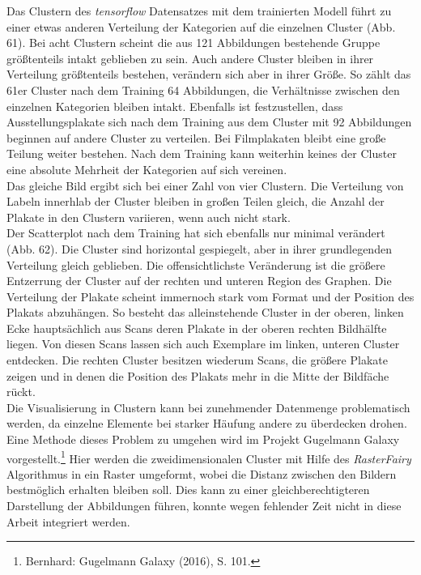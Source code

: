 \documentclass[a4paper,12pt,ngerman]{article}
\begin{document}
Das Clustern des \textit{tensorflow} Datensatzes mit dem trainierten Modell führt zu einer etwas anderen Verteilung der Kategorien auf die einzelnen Cluster (Abb. 61). Bei acht Clustern scheint die aus 121 Abbildungen bestehende Gruppe größtenteils intakt geblieben zu sein. Auch andere Cluster bleiben in ihrer Verteilung größtenteils bestehen, verändern sich aber in ihrer Größe. So zählt das 61er Cluster nach dem Training 64 Abbildungen, die Verhältnisse zwischen den einzelnen Kategorien bleiben intakt. Ebenfalls ist festzustellen, dass Ausstellungsplakate sich nach dem Training aus dem Cluster mit 92 Abbildungen beginnen auf andere Cluster zu verteilen. Bei Filmplakaten bleibt eine große Teilung weiter bestehen. Nach dem Training kann weiterhin keines der Cluster eine absolute Mehrheit der Kategorien auf sich vereinen. \\
Das gleiche Bild ergibt sich bei einer Zahl von vier Clustern. Die Verteilung von Labeln innerhlab der Cluster bleiben in großen Teilen gleich, die Anzahl der Plakate in den Clustern variieren, wenn auch nicht stark. \\
Der Scatterplot nach dem Training hat sich ebenfalls nur minimal verändert (Abb. 62). Die Cluster sind horizontal gespiegelt, aber in ihrer grundlegenden Verteilung gleich geblieben. Die offensichtlichste Veränderung ist die größere Entzerrung der Cluster auf der rechten und unteren Region des Graphen. Die Verteilung der Plakate scheint immernoch stark vom Format und der Position des Plakats abzuhängen. So besteht das alleinstehende Cluster in der oberen, linken Ecke hauptsächlich aus Scans deren Plakate in der oberen rechten Bildhälfte liegen. Von diesen Scans lassen sich auch Exemplare im linken, unteren Cluster entdecken. Die rechten Cluster besitzen wiederum Scans, die größere Plakate zeigen und in denen die Position des Plakats mehr in die Mitte der Bildfäche rückt. \\
Die Visualisierung in Clustern kann bei zunehmender Datenmenge problematisch werden, da einzelne Elemente bei starker Häufung andere zu überdecken drohen. Eine Methode dieses Problem zu umgehen wird im Projekt Gugelmann Galaxy vorgestellt.\footnote{Bernhard: Gugelmann Galaxy (2016), S. 101.} Hier werden die zweidimensionalen Cluster mit Hilfe des \textit{RasterFairy} Algorithmus in ein Raster umgeformt, wobei die Distanz zwischen den Bildern bestmöglich erhalten bleiben soll. Dies kann zu einer gleichberechtigteren Darstellung der Abbildungen führen, konnte wegen fehlender Zeit nicht in diese Arbeit integriert werden. \\
\end{document}
